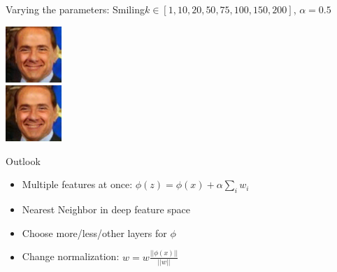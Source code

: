 \documentclass[11pt]{beamer}
\begin{document}
\begin{frame}{Varying the parameters: Smiling}{$k \in [1, 10, 20, 50, 75, 100, 150, 200]$, $\alpha=0.5$}
\begin{minipage}{81px}
	\end{minipage}%
	\begin{minipage}{81px}
		\includegraphics[width=80px]{../pictures/outputs/alpha_k/Smiling/alpha0.4/Silvio_Berlusconi_0023_alpha-0.4_k-502017-02-07_14-12-22.png}\\
		\includegraphics[width=80px]{../pictures/outputs/alpha_k/Smiling/alpha0.4/Silvio_Berlusconi_0023_alpha-0.4_k-2002017-02-07_14-19-11.png}
	\end{minipage}%
\end{frame}


\begin{frame}{Outlook}
	\begin{itemize}
		\item Multiple features at once: $\phi(z) = \phi(x) + \alpha \sum_{i} w_i$
		\item Nearest Neighbor in deep feature space
		\item Choose more/less/other layers for $\phi$
		\item Change normalization: $w = w\frac{||\phi(x)||}{||w||}$
	\end{itemize}
\end{frame}
\end{document}
